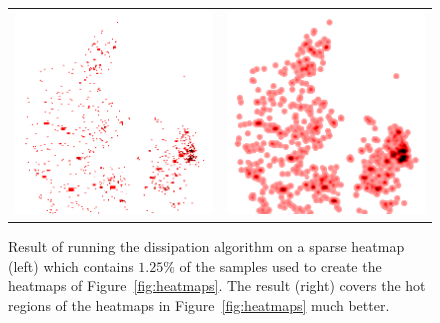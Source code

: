 \documentclass[11pt, oneside]{report}
\begin{document}
\begin{figure}
\centering
\begin{tabular}{ll}
\includegraphics[scale=0.5]{figs-tileheat/heat_d-before.png} & \includegraphics[scale=0.5]{figs-tileheat/heat_d-after.png} \\
\end{tabular}
\caption{Result of running the dissipation algorithm on a sparse heatmap (left) which contains $1.25\%$ of the samples used to create the heatmaps of Figure~\ref{fig:heatmaps}. The result (right) covers the hot regions of the heatmaps in Figure~\ref{fig:heatmaps} much better.}
\label{fig:dissipate_before_after}
\end{figure}
\end{document}
